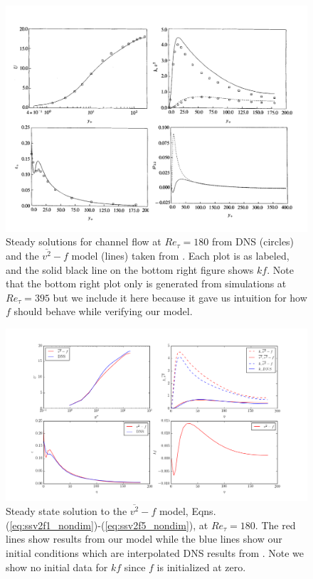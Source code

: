 \documentclass[a4paper,11pt]{article}
\begin{document}
\begin{figure}[b!]
 \centering
 \includegraphics[width=\textwidth]{durbin180}
 \caption{Steady solutions for channel flow at $Re_\tau=180$ from DNS (circles)
and the $\overline{v^2}-f$ model (lines) taken from \cite{durbin180}. Each plot
is as labeled, and the solid black line on the bottom right figure shows $kf$.
Note that the bottom right plot only is generated from simulations at $Re_\tau =
395$ but we include it here because it gave us intuition for how $f$ should
behave while verifying our model.}
 \label{fig:durbin180}
\end{figure}

\begin{figure}[!ht]
 \centering
 \includegraphics[width=\textwidth]{results_180}
 \caption{Steady state solution to the $\overline{v^2}-f$ model, Eqns.
(\ref{eq:ssv2f1_nondim})-(\ref{eq:ssv2f5_nondim}), at $Re_\tau=180$. The red
lines show results from our model while the blue lines show our
initial conditions which are interpolated DNS results from \cite{Lee}. Note we
show no initial data for $kf$ since $f$ is initialized at zero.}
 \label{fig:results_180}
\end{figure}
\end{document}
